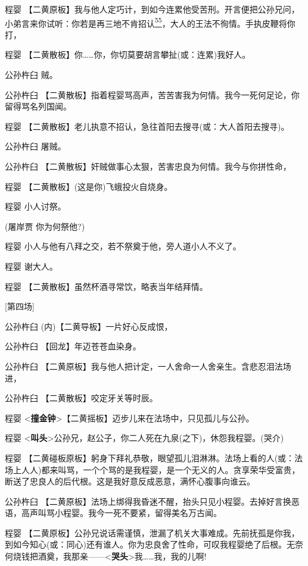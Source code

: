 程婴
【二黄原板】我与他人定巧计，到如今连累他受苦刑。开言便把公孙兄问，小弟言来你试听：你若是再三地不肯招认\protect\hyperlink{fn55}{\textsuperscript{55}}，大人的王法不徇情。手执皮鞭将你打，

程婴
【二黄散板】你\ldots{}\ldots{}你，你切莫要胡言攀扯(或：连累)我好人。

公孙杵臼 贼。

公孙杵臼
【二黄散板】指着程婴骂高声，苦苦害我为何情。我今一死何足论，你留得骂名列国闻。

程婴 【二黄散板】老儿执意不招认，急往首阳去搜寻(或：大人首阳去搜寻)。

公孙杵臼 屠贼。

公孙杵臼 【二黄散板】奸贼做事心太狠，苦害忠良为何情。我今与你拼性命，

程婴 【二黄散板】(这是你)飞蛾投火自烧身。

程婴 小人讨祭。

(屠岸贾 你为何祭他?)

程婴 小人与他有八拜之交，若不祭奠于他，旁人道小人不义了。

程婴 谢大人。

程婴 【二黄散板】虽然杯酒寻常饮，略表当年结拜情。

{[}第四场{]}

公孙杵臼 (内)【二黄导板】一片好心反成恨，

公孙杵臼 【回龙】年迈苍苍血染身。

公孙杵臼
【二黄原板】我与他人把计定，一人舍命一人舍亲生。含悲忍泪法场进，

公孙杵臼 【二黄散板】咬定牙关等时辰。

程婴
\textless{}\textbf{撞金钟}\textgreater{}【二黄摇板】迈步儿来在法场中，只见孤儿与公孙。

程婴
\textless{}\textbf{叫头}\textgreater{}公孙兄，赵公子，你二人死在九泉(之下)，休怨我程婴。(哭介)

程婴
【二黄碰板原板】躬身下拜礼恭敬，眼望孤儿泪淋淋。法场上看的人(或：法场上人人)都来叫骂，一个个骂的是我程婴，是一个无义的人。贪享荣华受富贵，断送了忠良人的后代根。这是我好意反成恶意，满怀心腹事向谁云。

公孙杵臼
【二黄原板】法场上绑得我昏迷不醒，抬头只见小程婴。去掉好言换恶语，高声叫骂小程婴。我今一死不要紧，留得美名万古闻。

程婴
【二黄原板】公孙兄说话需谨慎，泄漏了机关大事难成。先前抚孤是你我，到如今知心(或：同心)还有谁人。你为忠良舍了性命，可叹我程婴绝了后根。无奈何烧钱把酒奠，我那亲------\textless{}\textbf{哭头}\textgreater{}我\ldots{}\ldots{}我，我的儿啊!

